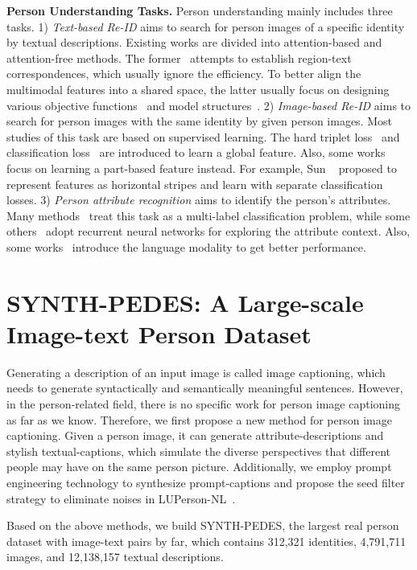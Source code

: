 \documentclass[10pt,twocolumn,letterpaper]{article}
\begin{document}
\noindent
\textbf{Person Understanding Tasks.}
Person understanding mainly includes three tasks. 1) \textit{Text-based Re-ID} aims to search for person images of a specific identity by textual descriptions. Existing works are divided into attention-based and attention-free methods. The former~\cite{SMAT,textreid,MG,SSAN, LGUR} attempts to establish region-text correspondences, which usually ignore the efficiency. To better align the multimodal features into a shared space, the latter usually focus on designing various objective functions~\cite{CMPM,vse++,ARL} and model structures~\cite{vitaa,dualpath}. 2) \textit{Image-based Re-ID} aims to search for person images with the same identity by given person images. Most studies of this task are based on supervised learning. The hard triplet loss~\cite{triplet1,triplet2,triplet3} and classification loss~\cite{SGGNN,DCNN} are introduced to learn a global feature. Also, some works~\cite{PABR,BPM} focus on learning a part-based feature instead. For example, Sun ~\cite{BPM} proposed to represent features as horizontal stripes and learn with separate classification losses. 3) \textit{Person attribute recognition} aims to identify the person’s attributes. Many methods~\cite{a1,a2,a3} treat this task as a multi-label classification problem, while some others~\cite{a4,a5,a6} adopt recurrent neural networks for exploring the attribute context. Also, some works~\cite{VTB,Label2Label} introduce the language modality to get better performance. 
 


\section{SYNTH-PEDES: A Large-scale Image-text Person Dataset}
Generating a description of an input image is called image captioning, which needs to generate syntactically and semantically meaningful sentences. However, in the person-related field, there is no specific work for person image captioning as far as we know. Therefore, we first propose a new method for person image captioning. Given a person image, it can generate attribute-descriptions and stylish textual-captions, which simulate the diverse perspectives that different people may have on the same person picture. Additionally, we employ prompt engineering technology to synthesize prompt-captions and propose the seed filter strategy to eliminate noises in LUPerson-NL~\cite{LUPnl}.

Based on the above methods, we build SYNTH-PEDES, the largest real person dataset with image-text pairs by far, which contains 312,321 identities, 4,791,711 images, and 12,138,157 textual descriptions. 
\end{document}
